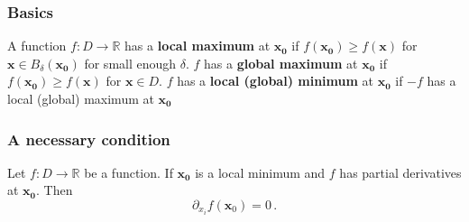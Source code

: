 \documentclass[aspectratio=169]{beamer}
\begin{document}
\begin{frame}
    \frametitle{Basics}
\begin{definition}
A function \(f:D \to \mathbb{R}\) has a \textbf{local maximum} at \(\mathbf{x_0}\) if
\(f(\mathbf{x_0}) \geq f(\mathbf{x})\) for \(\mathbf{x} \in B_\delta(\mathbf{x_0})\) for small enough \(\delta\).
\(f\) has a \textbf{global maximum} at \(\mathbf{x_0}\) if
\(f(\mathbf{x_0}) \geq f(\mathbf{x})\) for \(\mathbf{x} \in D\).
\(f\) has a \textbf{local (global) minimum} at \(\mathbf{x_0}\) if
\(-f\) has a local (global) maximum at \(\mathbf{x_0}\)
\end{definition}

\end{frame}


\begin{frame}
    \frametitle{A necessary condition}
\begin{theorem}
Let \(f:D \to \mathbb{R}\) be a function.
If \(\mathbf{x_0}\) is a local minimum and \(f\) has partial derivatives at \(\mathbf{x_0}\).
Then
\begin{equation*}
    \partial_{x_i} f(\mathbf{x}_0) = 0 \,.
\end{equation*}
\end{theorem}
\end{frame}
\end{document}
